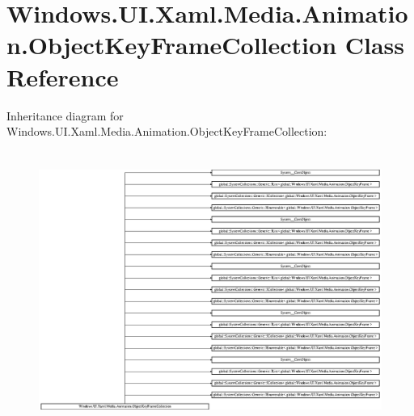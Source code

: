 \hypertarget{class_windows_1_1_u_i_1_1_xaml_1_1_media_1_1_animation_1_1_object_key_frame_collection}{}\section{Windows.\+U\+I.\+Xaml.\+Media.\+Animation.\+Object\+Key\+Frame\+Collection Class Reference}
\label{class_windows_1_1_u_i_1_1_xaml_1_1_media_1_1_animation_1_1_object_key_frame_collection}
Inheritance diagram for Windows.\+U\+I.\+Xaml.\+Media.\+Animation.\+Object\+Key\+Frame\+Collection\+:\begin{figure}[H]
\begin{center}
\leavevmode
\includegraphics[height=9.088099cm]{class_windows_1_1_u_i_1_1_xaml_1_1_media_1_1_animation_1_1_object_key_frame_collection}
\end{center}
\end{figure}
